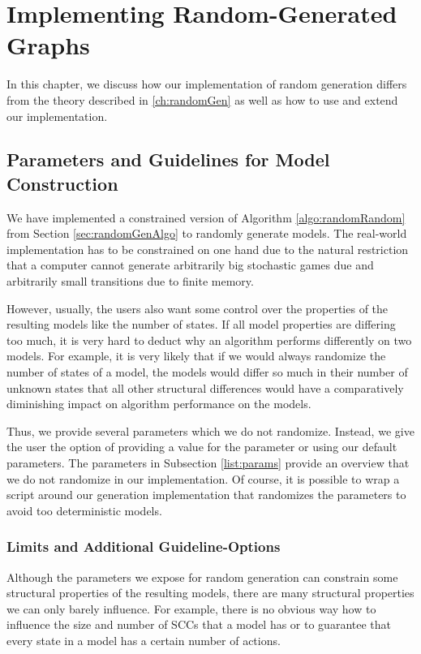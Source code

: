 \chapter{Implementing Random-Generated Graphs} \label{ch:implementedRandomGen}
In this chapter, we discuss how our implementation of random generation differs from the theory described in \ref{ch:randomGen} as well as how to use and extend our implementation. 

\section{Parameters and Guidelines for Model Construction} \label{sec:guidelines}
We have implemented a constrained version of Algorithm \ref{algo:randomRandom} from Section \ref{sec:randomGenAlgo} to randomly generate models.
The real-world implementation has to be constrained on one hand due to the natural restriction that a computer cannot generate arbitrarily big stochastic games due and 
arbitrarily small transitions due to finite memory.

However, usually, the users also want some control over the properties of the resulting models like the number of states.
If all model properties are differing too much, it is very hard to deduct why an algorithm performs differently on two models.
For example, it is very likely that if we would always randomize the number of states of a model, the models would differ so much in their number of unknown states that all other structural differences 
would have a comparatively diminishing impact on algorithm performance on the models.

Thus, we provide several parameters which we do not randomize. Instead, we give the user the option of providing a value for the parameter or using our default parameters.
The parameters in Subsection \ref{list:params} provide an overview that we do not randomize in our implementation.
Of course, it is possible to wrap a script around our generation implementation that randomizes the parameters to avoid too deterministic models.

\subsection{Limits and Additional Guideline-Options}
Although the parameters we expose for random generation can constrain some structural properties of the resulting models, 
there are many structural properties we can only barely influence. For example, there is no obvious way how to influence the size and number of SCCs that a model has or to guarantee
that every state in a model has a certain number of actions.

